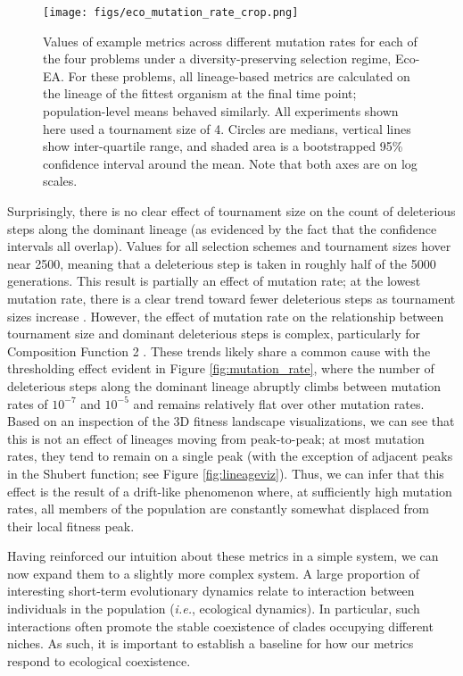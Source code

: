 \documentclass[letterpaper]{article}
\newcommand{\reduceCaptionPadding}{\setlength{\belowcaptionskip}{-10pt}}
\begin{document}
\begin{figure}
\centering
\texttt{[image: figs/eco\_mutation\_rate\_crop.png]}
\reduceCaptionPadding
\caption{\small Values of example metrics across different mutation rates for each of the four problems under a diversity-preserving selection regime, Eco-EA. For these problems, all lineage-based metrics are calculated on the lineage of the fittest organism at the final time point; population-level means behaved similarly. All experiments shown here used a tournament size of 4. Circles are medians, vertical lines show inter-quartile range, and shaded area is a bootstrapped 95\% confidence interval around the mean. Note that both axes are on log scales.}
\label{fig:ecology}
\end{figure}


Surprisingly, there is no clear effect of tournament size on the count of deleterious steps along the dominant lineage (as evidenced by the fact that the confidence intervals all overlap). Values for all selection schemes and tournament sizes hover near 2500, meaning that a deleterious step is taken in roughly half of the 5000 generations. This result is partially an effect of mutation rate; at the lowest mutation rate, there is a clear trend toward fewer deleterious steps as tournament sizes increase \citep{zenodo_supplement}. However, the effect of mutation rate on the relationship between tournament size and dominant deleterious steps is complex, particularly for Composition Function 2 \citep{zenodo_supplement}. These trends likely share a common cause with the thresholding effect evident in Figure \ref{fig:mutation_rate}, where the number of deleterious steps along the dominant lineage abruptly climbs between mutation rates of %
$10^{-7}$ and $10^{-5}$
and remains relatively flat over other mutation rates. Based on an inspection of the 3D fitness landscape visualizations, we can see that this is not an effect of lineages moving from peak-to-peak; at most mutation rates, they tend to remain on a single peak (with the exception of adjacent peaks in the Shubert function; see Figure \ref{fig:lineageviz}). Thus, we can infer that this effect is the result of a drift-like phenomenon where, at sufficiently high mutation rates, all members of the population are constantly somewhat displaced from their local fitness peak.

Having reinforced our intuition about these metrics in a simple system, we can now expand them to a slightly more complex system. A large proportion of interesting short-term evolutionary dynamics relate to interaction between individuals in the population (\textit{i.e.}, ecological dynamics). In particular, such interactions often promote the stable coexistence of clades occupying different niches. As such, it is important to establish a baseline for how our metrics respond to ecological coexistence. 
\end{document}
